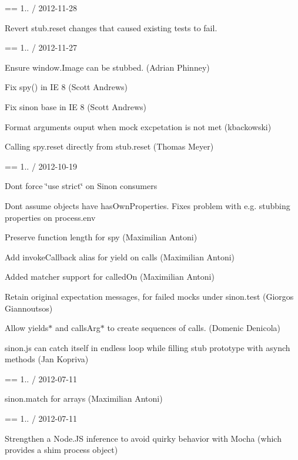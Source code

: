== 1.. / 2012-\/11-\/28
\begin{DoxyItemize}
\item Revert stub.\+reset changes that caused existing tests to fail.
\end{DoxyItemize}

== 1.. / 2012-\/11-\/27
\begin{DoxyItemize}
\item Ensure window.\+Image can be stubbed. (Adrian Phinney)
\item Fix spy() in IE 8 (Scott Andrews)
\item Fix sinon base in IE 8 (Scott Andrews)
\item Format arguments ouput when mock excpetation is not met (kbackowski)
\item Calling spy.\+reset directly from stub.\+reset (Thomas Meyer)
\end{DoxyItemize}

== 1.. / 2012-\/10-\/19
\begin{DoxyItemize}
\item Don\textquotesingle{}t force \char`\"{}use strict\char`\"{} on Sinon consumers
\item Don\textquotesingle{}t assume objects have has\+Own\+Properties. Fixes problem with e.\+g. stubbing properties on process.\+env
\item Preserve function length for spy (Maximilian Antoni)
\item Add \textquotesingle{}invoke\+Callback\textquotesingle{} alias for \textquotesingle{}yield\textquotesingle{} on calls (Maximilian Antoni)
\item Added matcher support for called\+On (Maximilian Antoni)
\item Retain original expectation messages, for failed mocks under sinon.\+test (Giorgos Giannoutsos)
\item Allow yields$\ast$ and calls\+Arg$\ast$ to create sequences of calls. (Domenic Denicola)
\item sinon.\+js can catch itself in endless loop while filling stub prototype with asynch methods (Jan Kopriva)
\end{DoxyItemize}

== 1.. / 2012-\/07-\/11
\begin{DoxyItemize}
\item sinon.\+match for arrays (Maximilian Antoni)
\end{DoxyItemize}

== 1.. / 2012-\/07-\/11
\begin{DoxyItemize}
\item Strengthen a Node.\+JS inference to avoid quirky behavior with Mocha (which provides a shim process object)
\end{DoxyItemize}


